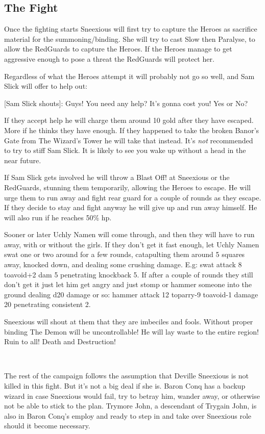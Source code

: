 \subsection*{The Fight}
Once the fighting starts Sneexious will first try to capture the Heroes as sacrifice material for the summoning/binding. She will try to cast Slow then Paralyse, to allow the RedGuards to capture the Heroes. If the Heroes manage to get aggressive enough to pose a threat the RedGuards will protect her.

Regardless of what the Heroes attempt it will probably not go so well, and Sam Slick will offer to help out:
\begin{readoutloud}
\textnormal{[Sam Slick shouts]:} Guys! You need any help? It's gonna cost you! Yes or No?
\end{readoutloud}
If they accept help he will charge them around 10 gold after they have escaped. More if he thinks they have enough. If they happened to take the broken Banor's Gate from The Wizard's Tower he will take that instead. It's \emph{not} recommended to try to stiff Sam Slick. It is likely to see you wake up without a head in the near future.

If Sam Slick gets involved he will throw a Blast Off! at Sneexious or the RedGuards, stunning them temporarily, allowing the Heroes to escape. He will urge them to run away and fight rear guard for a couple of rounds as they escape. If they decide to stay and fight anyway he will give up and run away himself. He will also run if he reaches 50\% hp.

Sooner or later Uchly Namen will come through, and then they will have to run away, with or without the girls. If they don't get it fast enough, let Uchly Namen swat one or two around for a few rounds, catapulting them around 5 squares away, knocked down, and dealing some crushing damage. E.g: swat attack 8 toavoid+2 dam 5 penetrating knockback 5. If after a couple of rounds they still don't get it just let him get angry and just stomp or hammer someone into the ground dealing d20 damage or so: hammer attack 12 toparry-9 toavoid-1 damage 20 penetrating consistent 2.

Sneexious will shout at them that they are imbeciles and fools. Without proper binding The Demon will be uncontrollable! He will lay waste to the entire region! Ruin to all! Death and Destruction!

\

The rest of the campaign follows the assumption that Deville Sneexious is not killed in this fight. But it's not a big deal if she is. Baron Conq has a backup wizard in case Sneexious would fail, try to betray him, wander away, or otherwise not be able to stick to the plan. Trymore John, a descendant of Trygain John, is also in Baron Conq's employ and ready to step in and take over Sneexious role should it become necessary.

